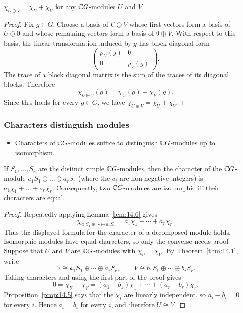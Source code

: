 \documentclass[../Odyssey_Project.tex]{subfiles}
\begin{document}
\begin{lemma}
\label{lem:14.6}
$\chi_{U \oplus V} = \chi_U + \chi_V$ for any $\mathbb{C} G$-modules $U$ and $V$.
\end{lemma}
\begin{proof}
    Fix $g \in G$. Choose a basis of $U \oplus V$ whose first vectors form a basis of $U \oplus 0$ and whose remaining vectors form a basis of $0 \oplus V$. With respect to this basis, the linear transformation induced by $g$ has block diagonal form
    \[
        \begin{pmatrix}
            \rho_U(g) & 0\\
            0 & \rho_V(g)
        \end{pmatrix}.
    \]
    The trace of a block diagonal matrix is the sum of the traces of its diagonal blocks. Therefore
    \[
        \chi_{U \oplus V}(g)=\chi_U(g)+\chi_V(g).
    \]
    Since this holds for every $g \in G$, we have $\chi_{U \oplus V}=\chi_U+\chi_V$.
\end{proof}

\subsubsection*{Characters distinguish modules}
\begin{itemize}
    \item Characters of $\mathbb{C} G$-modules suffice to distinguish $\mathbb{C} G$-modules up to isomorphism.
\end{itemize}

\begin{theorem}
\label{thm:14.7}
If $S_1, \ldots, S_r$ are the distinct simple $\mathbb{C} G$-modules, then the character of the $\mathbb{C} G$-module $a_1 S_1 \oplus \ldots \oplus a_r S_r$ (where the $a_i$ are non-negative integers) is $a_1 \chi_1 + \ldots + a_r \chi_r$. Consequently, two $\mathbb{C} G$-modules are isomorphic iff their characters are equal.
\end{theorem}
\begin{proof}
    Repeatedly applying Lemma~\ref{lem:14.6} gives
    \[
        \chi_{a_1S_1 \oplus \cdots \oplus a_rS_r}
        =
        a_1\chi_1+\cdots+a_r\chi_r.
    \]
    Thus the displayed formula for the character of a decomposed module holds.\\
    Isomorphic modules have equal characters, so only the converse needs proof. Suppose that $U$ and $V$ are $\mathbb{C} G$-modules with $\chi_U=\chi_V$. By Theorem~\ref{thm:14.1}, write
    \[
        U \cong a_1S_1 \oplus \cdots \oplus a_rS_r,
        \qquad
        V \cong b_1S_1 \oplus \cdots \oplus b_rS_r.
    \]
    Taking characters and using the first part of the proof gives
    \[
        0=\chi_U-\chi_V=(a_1-b_1)\chi_1+\cdots+(a_r-b_r)\chi_r.
    \]
    Proposition~\ref{prop:14.5} says that the $\chi_i$ are linearly independent, so $a_i-b_i=0$ for every $i$. Hence $a_i=b_i$ for every $i$, and therefore $U \cong V$.
\end{proof}
\end{document}

